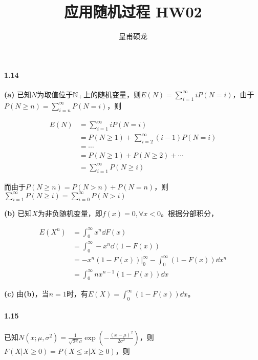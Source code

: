\documentclass{article}
\title{应用随机过程 HW02}
\author{皇甫硕龙}
\begin{document}
    \maketitle

    \paragraph*{1.14} \textbf{(a)} 已知$N$为取值位于$\mathbb N_+$上的随机变量，则$E(N) = \sum_{i=1}^\infty iP(N = i)$，由于$P(N \geqslant n) = \sum_{i=n}^\infty P(N=i)$，则

    \begin{equation}
        \begin{aligned}
            E(N) &= \sum_{i = 1}^\infty iP(N = i) \\
            &= P(N\geq 1) + \sum_{i = 2}^\infty (i - 1)P(N = i) \\
            &= \cdots \\
            &= P(N\geq 1) + P(N\geq 2) + \cdots \\
            &= \sum_{i = 1} ^ \infty P(N\geq i)
        \end{aligned}
    \end{equation}

    而由于$P(N \geq n) = P(N > n) + P(N = n)$，则$\sum_{i = 1} ^ \infty P(N\geq i) = \sum_{i = 0} ^ \infty P(N > i)$

    \textbf{(b)} 已知$X$为非负随机变量，即$f(x) = 0, \forall x < 0$。根据分部积分，

    \begin{equation}
        \begin{aligned}
            E(X^n) &= \int_{0}^{\infty} x^n\dd F(x) \\
            &= \int_{0}^{\infty} -x^n\dd (1-F(x)) \\
            &= \left. -x^n(1-F(x))\right |^\infty_0 - \int_0^\infty (1-F(x))\dd x^n \\
            &= \int_0^\infty nx^{n-1}(1-F(x))\dd x
        \end{aligned}
    \end{equation}

    \textbf{(c)} 由\textbf{(b)}，当$n = 1$时，有$E(X) = \int_{0}^{\infty} (1 - F(x))\dd x$。

    \paragraph*{1.15} 已知$N(x; \mu, \sigma^2) = \frac{1}{\sqrt{2\pi}\sigma}\exp\left(-\frac{(x-\mu)^2}{2\sigma^2}\right)$，则$F(X|X\geq 0) = P(X\leq x | X\geq 0)$，则
\end{document}
